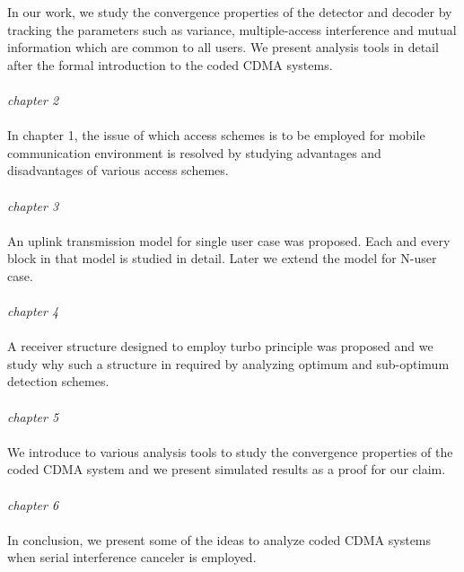 In our work, we study the convergence properties of the detector and decoder by tracking the parameters such as variance, multiple-access interference and mutual information which are common to all users. We present analysis tools in detail after the formal introduction to the coded CDMA systems. \\ \\
\textit{chapter 2} \\ \\
In chapter 1, the issue of which access schemes is to be employed for mobile communication environment is resolved by studying advantages and disadvantages of various access schemes. \\ \\
\textit{chapter 3} \\ \\
An uplink transmission model for single user case was proposed. Each and every block in that model is studied in detail. Later we extend the model for N-user case. \\ \\
\textit{chapter 4} \\ \\
A receiver structure designed to employ turbo principle was proposed and we study why such a structure in required by analyzing optimum and sub-optimum detection schemes. \\ \\
\textit{chapter 5} \\ \\
We introduce to various analysis tools to study the convergence properties of the coded CDMA system and we present simulated results as a proof for our claim. \\ \\
\textit{chapter 6} \\ \\
In conclusion, we present some of the ideas to analyze coded CDMA systems when serial interference canceler is employed.

	
	

	


